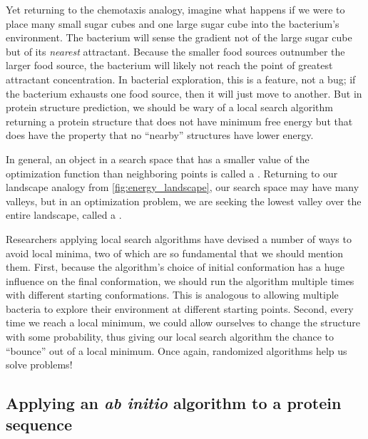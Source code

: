 Yet returning to the chemotaxis analogy, imagine what happens if we were to place many small sugar cubes and one large sugar cube into the bacterium's environment. The bacterium will sense the gradient not of the large sugar cube but of its \textit{nearest} attractant. Because the smaller food sources outnumber the larger food source, the bacterium will likely not reach the point of greatest attractant concentration. In bacterial exploration, this is a feature, not a bug; if the bacterium exhausts one food source, then it will just move to another. But in protein structure prediction, we should be wary of a local search algorithm returning a protein structure that does not have minimum free energy but that does have the property that no ``nearby'' structures have lower energy.

In general, an object in a search space that has a smaller value of the optimization function than neighboring points is called a . Returning to our landscape analogy from \autoref{fig:energy_landscape}, our search space may have many valleys, but in an optimization problem, we are seeking the lowest valley over the entire landscape, called a .\\

\begin{qbox}\end{qbox}

Researchers applying local search algorithms have devised a number of ways to avoid local minima, two of which are so fundamental that we should mention them. First, because the algorithm's choice of initial conformation has a huge influence on the final conformation, we should run the algorithm multiple times with different starting conformations. This is analogous to allowing multiple bacteria to explore their environment at different starting points. Second, every time we reach a local minimum, we could allow ourselves to change the structure with some probability, thus giving our local search algorithm the chance to ``bounce'' out of a local minimum. Once again, randomized algorithms help us solve problems!

\FloatBarrier
{}
\subsection{Applying an \textit{ab initio} algorithm to a protein sequence}

